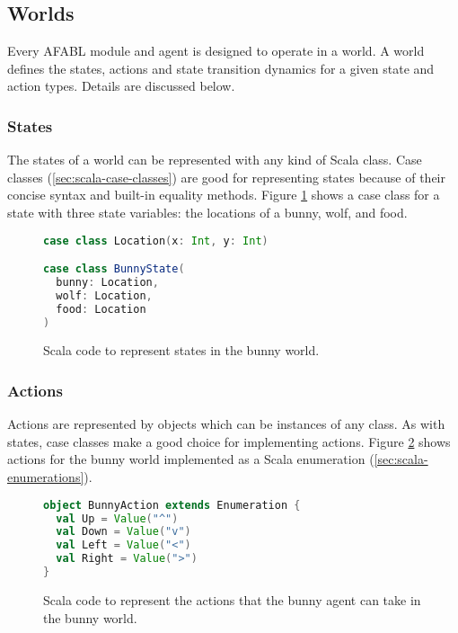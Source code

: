 \subsection{Worlds}

Every AFABL module and agent is designed to operate in a world. A world defines the states, actions and state transition dynamics for a given state and action types. Details are discussed below.

\subsubsection{States}

The states of a world can be represented with any kind of Scala class. Case classes (\ref{sec:scala-case-classes}) are good for representing states because of their concise syntax and built-in equality methods. Figure \ref{fig:bunny-state-code} shows a case class for a state with three state variables: the locations of a bunny, wolf, and food.

\begin{figure}[!h]
\begin{center}

\begin{lstlisting}[language=Scala]
case class Location(x: Int, y: Int)

case class BunnyState(
  bunny: Location,
  wolf: Location,
  food: Location
)
\end{lstlisting}

\caption{Scala code to represent states in the bunny world.}
\end{center}
\label{fig:bunny-state-code}
\end{figure}

\subsubsection{Actions}

Actions are represented by objects which can be instances of any class. As with states, case classes make a good choice for implementing actions. Figure \ref{fig:bunny-action-code} shows actions for the bunny world implemented as a Scala enumeration (\ref{sec:scala-enumerations}).

\begin{figure}[!h]
\begin{center}

\begin{lstlisting}[language=Scala]
object BunnyAction extends Enumeration {
  val Up = Value("^")
  val Down = Value("v")
  val Left = Value("<")
  val Right = Value(">")
}
\end{lstlisting}

\caption{Scala code to represent the actions that the bunny agent can take in the bunny world.}
\end{center}
\label{fig:bunny-action-code}
\end{figure}

